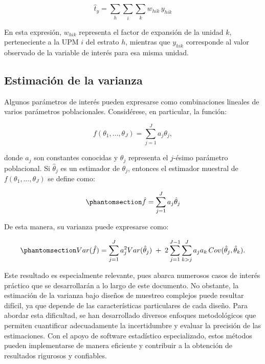 \documentclass[
  spanish,
  11pt,
  letterpaper,
  oneside,
  open=any]{scrbook}
\begin{document}
\[\hat{t}_y = \sum_{h} \sum_{i} \sum_{k} w_{hik} \, y_{hik}\]

En esta expresión, \(w_{hik}\) representa el factor de expansión de la
unidad \(k\), perteneciente a la UPM \(i\) del estrato \(h\), mientras
que \(y_{hik}\) corresponde al valor observado de la variable de interés
para esa misma unidad.

\subsection{Estimación de la varianza}\label{estimacion-de-la-varianza}

Algunos parámetros de interés pueden expresarse como combinaciones
lineales de varios parámetros poblacionales. Considérese, en particular,
la función:

\[f(\theta_1,\ldots,\theta_J)=\sum_{j=1}^J a_j\theta_j,\]

donde \(a_j\) son constantes conocidas y \(\theta_j\) representa el
\(j\)-ésimo parámetro poblacional. Si \(\hat{\theta}_j\) es un estimador
de \(\theta_j\), entonces el estimador muestral de
\(f(\theta_1,\ldots,\theta_J)\) se define como:

\begin{equation}\protect\phantomsection\label{eq-estimador-contraste-lineal}{\hat{f} = \sum_{j=1}^J a_j \hat{\theta}_j}\end{equation}

De esta manera, su varianza puede expresarse como:

\begin{equation}\protect\phantomsection\label{eq-varianza-contraste-lineal}{Var(\hat{f}) = \sum_{j=1}^J a_j^2 Var(\hat{\theta}_j)
\;+\;
2\sum_{j=1}^{J-1}\sum_{k>j}^J
a_j a_k \, Cov(\hat{\theta}_j,\hat{\theta}_k).}\end{equation}

Este resultado es especialmente relevante, pues abarca numerosos casos
de interés práctico que se desarrollarán a lo largo de este documento.
No obstante, la estimación de la varianza bajo diseños de muestreo
complejos puede resultar difícil, ya que depende de las características
particulares de cada diseño. Para abordar esta dificultad, se han
desarrollado diversos enfoques metodológicos que permiten cuantificar
adecuadamente la incertidumbre y evaluar la precisión de las
estimaciones. Con el apoyo de software estadístico especializado, estos
métodos pueden implementarse de manera eficiente y contribuir a la
obtención de resultados rigurosos y confiables.
\end{document}
